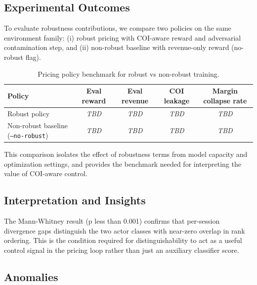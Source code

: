 \subsection{Experimental Outcomes}

To evaluate robustness contributions, we compare two policies on the same environment family: (i) robust pricing with COI-aware reward and adversarial contamination step, and (ii) non-robust baseline with revenue-only reward (no-robust flag).

\begin{table}[ht]
\centering
\caption{Pricing policy benchmark for robust vs non-robust training.}
\label{tab:pricing_benchmark}
\begin{tabular}{lcccc}
\toprule
Policy & Eval reward & Eval revenue & COI leakage & Margin collapse rate \\
\midrule
Robust policy & \textit{TBD} & \textit{TBD} & \textit{TBD} & \textit{TBD} \\
Non-robust baseline (\texttt{--no-robust}) & \textit{TBD} & \textit{TBD} & \textit{TBD} & \textit{TBD} \\
\bottomrule
\end{tabular}
\end{table}

This comparison isolates the effect of robustness terms from model capacity and optimization settings, and provides the benchmark needed for interpreting the value of COI-aware control.

\subsection{Interpretation and Insights}

The Mann-Whitney result (p less than 0.001) confirms that per-session divergence gaps distinguish the two actor classes with near-zero overlap in rank ordering. This is the condition required for distinguishability to act as a useful control signal in the pricing loop rather than just an auxiliary classifier score.

\subsection{Anomalies}
